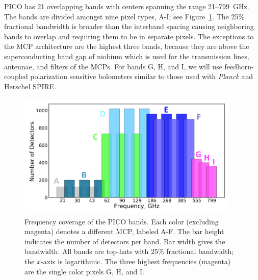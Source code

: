 \documentclass[]{spie}  %
\newcommand{\comr}[1]{\textcolor{red}{#1}}
\newcommand{\comb}[1]{\textcolor{blue}{#1}}
\begin{document}
PICO has 21 overlapping bands with centers spanning the range 21--799~GHz. The bands are divided amongst 
nine pixel types, A-I; see Figure~\ref{fig:bands}. 
The 25\% fractional bandwidth is broader than the interband spacing causing neighboring bands to 
overlap and requiring them to be in separate pixels. 
The exceptions to the MCP architecture are the highest three bands, because they are above the superconducting 
band gap of niobium which is used for the transmission lines, antennae, and filters of the MCPs.  
For bands G, H, and I, we will use feedhorn-coupled polarization sensitive bolometers similar to those used with 
\textit{Planck}\cite{planck2010_hfi} and Herschel SPIRE\cite{spire2010}.

\begin{figure} [ht]
\begin{center}
\includegraphics[height=6cm]{bands_label.png}
\end{center}
\caption { \label{fig:bands} 
Frequency coverage of the PICO bands. Each color (excluding magenta) denotes a different MCP, labeled A-F. The bar height 
indicates the number of detectors per band.  Bar width gives the bandwidth. All bands are top-hats with 
25\% fractional bandwidth; the $x$-axis is logarithmic.  The three highest frequencies (magenta) are the single color pixels G, H, and I.}
\end{figure} 
\end{document}
